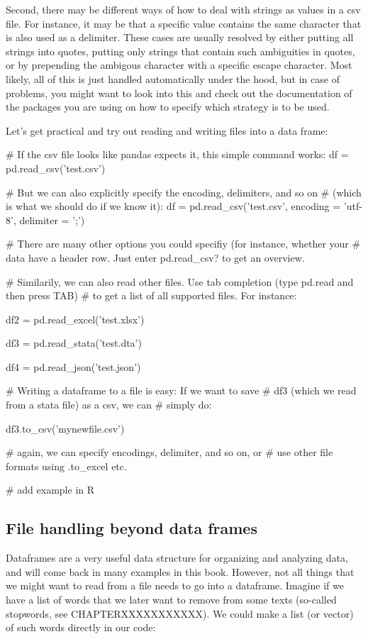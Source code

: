 Second, there may be different ways of how to deal with strings as values in a csv file. For instance, it may be that a specific value contains the same character that is also used as a delimiter. These cases are usually resolved by either putting all strings into quotes, putting only strings that contain such ambiguities in quotes, or by prepending the ambigous character with a specific escape character. Most likely, all of this is just handled automatically under the hood, but in case of problems, you might want to look into this and check out the documentation of the packages you are using on how to specify which strategy is to be used.

Let's get practical and try out reading and writing files into a data frame:

\begin{examplepy}
# If the csv file looks like pandas expects it, this simple command works:
df = pd.read_csv('test.csv')

# But we can also explicitly specify the encoding, delimiters, and so on
# (which is what we should do if we know it):
df = pd.read_csv('test.csv', encoding = 'utf-8', delimiter = ';')

# There are many other options you could specifiy (for instance, whether your
# data have a header row. Just enter pd.read_csv? to get an overview.

# Similarily, we can also read other files. Use tab completion (type pd.read and then press TAB)
# to get a list of all supported files. For instance:

df2 = pd.read_excel('test.xlsx')

df3 = pd.read_stata('test.dta')

df4 = pd.read_json('test.json')

# Writing a dataframe to a file is easy: If we want to save
# df3 (which we read from a stata file) as a csv, we can
# simply do:

df3.to_csv('mynewfile.csv')

# again, we can specify encodings, delimiter, and so on, or
# use other file formats using .to_excel etc.

\end{examplepy}


\begin{exampler}
# add example in R
\end{exampler}



\subsection{File handling beyond data frames}
Dataframes are a very useful data structure for organizing and analyzing data, and will come back in many examples in this book.
However, not all things that we might want to read from a file needs to go into a dataframe.
Imagine if we have a list of words that we later want to remove from some texts (so-called stopwords, see CHAPTERXXXXXXXXXXX).
We could make a list (or vector) of such words directly in our code:

